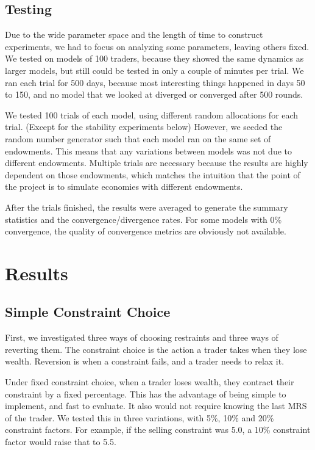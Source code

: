 \documentclass[12pt,a4paper,titlepage]{article}
\begin{document}
\subsection{Testing}
Due to the wide parameter space and the length of time to construct experiments, we had to focus on analyzing some parameters, leaving others fixed.
We tested on models of 100 traders, because they showed the same dynamics as larger models, but still could be tested in only a couple of minutes per trial.
We ran each trial for 500 days, because most interesting things happened in days 50 to 150, and no model that we looked at diverged or converged after 500 rounds.

We tested 100 trials of each model, using different random allocations for each trial.
(Except for the stability experiments below)
However, we seeded the random number generator such that each model ran on the same set of endowments.
This means that any variations between models was not due to different endowments.
Multiple trials are necessary because the results are highly dependent on those endowments, which matches the intuition that the point of the project is to simulate economies with different endowments.
    
After the trials finished, the results were averaged to generate the summary statistics and the convergence/divergence rates.
For some models with 0\% convergence, the quality of convergence metrics are obviously not available.

\section{Results}\label{results}
\subsection{Simple Constraint Choice}
First, we investigated three ways of choosing restraints and three ways of reverting them.
The constraint choice is the action a trader takes when they lose wealth.
Reversion is when a constraint fails, and a trader needs to relax it.

Under fixed constraint choice, when a trader loses wealth, they contract their constraint by a fixed percentage.
This has the advantage of being simple to implement, and fast to evaluate.
It also would not require knowing the last MRS of the trader.
We tested this in three variations, with 5\%, 10\% and 20\% constraint factors.
For example, if the selling constraint was 5.0, a 10\% constraint factor would raise that to 5.5.
    
\end{document}
